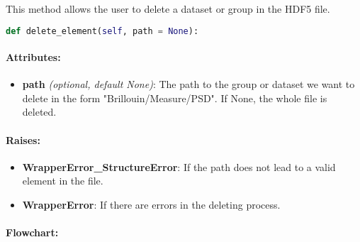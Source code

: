 This method allows the user to delete a dataset or group in the HDF5 file.

\begin{lstlisting}[language=Python]
def delete_element(self, path = None):
\end{lstlisting}

\paragraph{Attributes:}

\begin{itemize}
    \item \textbf{path} \textit{(optional, default None)}: The path to the group or dataset we want to delete in the form "Brillouin/Measure/PSD". If None, the whole file is deleted.
\end{itemize}

\paragraph{Raises:}
\begin{itemize}
    \item \textbf{WrapperError\_StructureError}: If the path does not lead to a valid element in the file.
    \item \textbf{WrapperError}: If there are errors in the deleting process.
\end{itemize}


\paragraph{Flowchart:}

